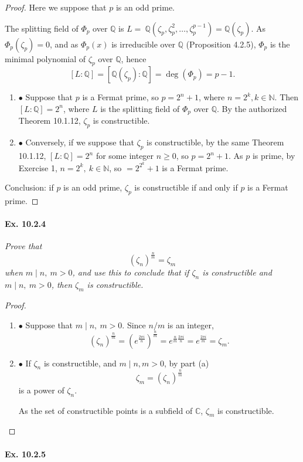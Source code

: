 \documentclass[11pt,a4paper]{article}
\newcommand{\be} {\begin{enumerate}}
\newcommand{\ee} {\end{enumerate}}
\newcommand{\Q}{\mathbb{Q}}
\newcommand{\N}{\mathbb{N}}
\newcommand{\C}{\mathbb{C}}
\begin{document}
\begin{proof} 
Here we suppose that $p$ is an odd prime.

The splitting field of $\Phi_p$ over $\Q$ is $L = \ \Q(\zeta_p,\zeta_p^2,\ldots,\zeta_p^{p-1}) =\Q(\zeta_p)$. As $\Phi_p(\zeta_p) = 0$, and as $\Phi_p(x)$ is irreducible over $\Q$ (Proposition 4.2.5), $\Phi_p$ is the minimal polynomial of $\zeta_p$ over $\Q$, hence
$$[L : \Q] = [\Q(\zeta_p) : \Q] = \deg(\Phi_p) = p-1.$$

\be
\item[$\bullet$] Suppose that $p$ is a Fermat prime, so $p=2^n +1$, where $n=2^k, k\in \N$. Then $[L:\Q] = 2^n$, where $L$ is the splitting field of $\Phi_p$ over $\Q$. By the authorized Theorem 10.1.12, $\zeta_p$ is constructible.

\item[$\bullet$]  Conversely, if we suppose that $\zeta_p$ is constructible, by the same Theorem 10.1.12, $[L:\Q] = 2^n$ for some integer $n\geq 0$, so $p=2^n+1$. As $p$ is prime, by Exercise 1, $n=2^k,\ k\in \N$, so $ = 2^{2^k}+1$ is a Fermat prime.
\ee
Conclusion: if $p$ is an odd prime, $\zeta_p$ is constructible if and only if $p$ is a Fermat prime.
\end{proof}

\paragraph{Ex. 10.2.4}

{\it Prove that $$(\zeta_n)^{\frac{n}{m}} = \zeta_m$$ when $m\mid n, \ m>0$, and use this to conclude that if $\zeta_n$ is constructible and $m\mid n,\ m>0$, then $\zeta_m$ is constructible.
}

\begin{proof} 
\be
\item[$\bullet$]  Suppose that $m \mid n,\ m>0$. Since $n/m$ is an integer,
$$(\zeta_n)^{\frac{n}{m}} = \left ( e^{\frac{2\pi i}{n}} \right )^{\frac{n}{m}} = e^{\frac{n}{m} \frac{2\pi i}{n}} = e^{\frac{2\pi i}{m}} = \zeta_m.$$
\item[$\bullet$] If $\zeta_n$ is constructible, and $m\mid n, m>0$, by part (a)
$$\zeta_m = (\zeta_n)^{\frac{n}{m}} $$
is a power of $\zeta_n$. 

As the set of constructible points is a subfield of $\C$, $\zeta_m$ is constructible.
\ee
\end{proof}

\paragraph{Ex. 10.2.5}
\end{document}
